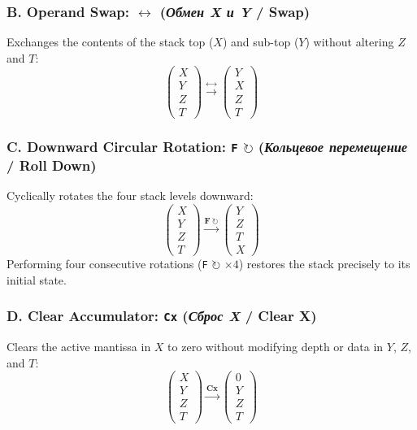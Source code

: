 \documentclass[11pt,a4paper]{article}
\begin{document}
\subsubsection{B. Operand Swap: \texorpdfstring{\texttt{$\leftrightarrow$}}{Swap} (\textit{Обмен X и Y} / Swap)}
Exchanges the contents of the stack top ($X$) and sub-top ($Y$) without altering $Z$ and $T$:
\[
\begin{pmatrix} X \\ Y \\ Z \\ T \end{pmatrix} \xrightarrow{\mathbf{\leftrightarrow}} \begin{pmatrix} Y \\ X \\ Z \\ T \end{pmatrix}
\]

\subsubsection{C. Downward Circular Rotation: \texorpdfstring{\texttt{F} $\circlearrowright$}{F Roll Down} (\textit{Кольцевое перемещение} / Roll Down)}
Cyclically rotates the four stack levels downward:
\[
\begin{pmatrix} X \\ Y \\ Z \\ T \end{pmatrix} \xrightarrow{\mathbf{F\ \circlearrowright}} \begin{pmatrix} Y \\ Z \\ T \\ X \end{pmatrix}
\]
Performing four consecutive rotations (\texttt{F} $\circlearrowright$ $\times 4$) restores the stack precisely to its initial state.

\subsubsection{D. Clear Accumulator: \texttt{Сх} (\textit{Сброс X} / Clear X)}
Clears the active mantissa in $X$ to zero without modifying depth or data in $Y$, $Z$, and $T$:
\[
\begin{pmatrix} X \\ Y \\ Z \\ T \end{pmatrix} \xrightarrow{\mathbf{Cx}} \begin{pmatrix} 0 \\ Y \\ Z \\ T \end{pmatrix}
\]
\end{document}
